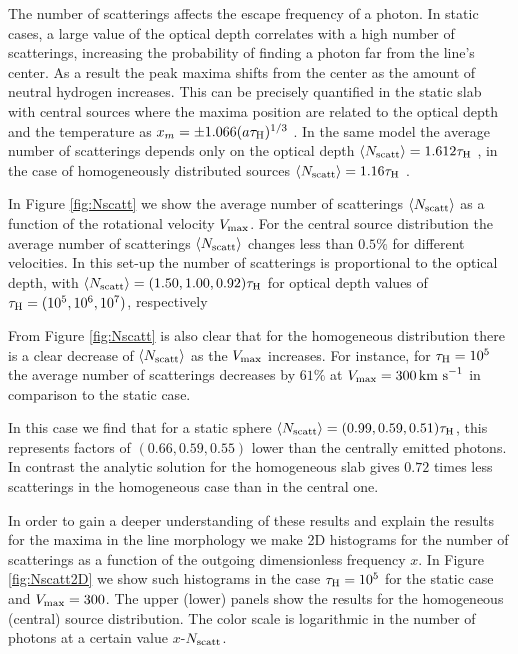 \documentclass{emulateapj}
\newcommand{\ly}{{\ifmmode{{\rm Ly}\alpha~}\else{Ly$\alpha$~}\fi}}
\newcommand{\kms}{{\ifmmode{{\mathrm{\,km\ s}^{-1}}}\else{\,km~s$^{-1}$}\fi}}
\begin{document}
The number of scatterings affects the escape frequency of a \ly photon.
In static cases, a large value of the optical depth correlates with a
high number of scatterings, increasing the probability of finding a
\ly photon far from the line's center. As a result the peak maxima
shifts from the center as the amount of neutral hydrogen
increases. This can be precisely quantified in the static slab
with central sources where the maxima position are related to
the optical depth and the temperature as $x_{m}=\pm 1.066(a\tau_{\rm
  H})^{1/3}$ \citep{Harrington73}. In the same model the average
number of scatterings depends only on the optical depth $\langle
N_{\rm  scatt}\rangle=1.612\tau_{\rm   H}$
\citep{Adams72,Harrington73}, in the case of homogeneously distributed
sources $\langle N_{\rm   scatt}\rangle=1.16\tau_{\rm   H}$
\citep{Harrington73}.   



In Figure \ref{fig:Nscatt} we show the average number of scatterings
$\langle N_{\rm scatt}\rangle$ as a function of the rotational velocity
$V_{\rm max}$. For the central source distribution the average number of
scatterings $\langle N_{\rm   scatt}\rangle$ changes less than $0.5\%$
for different velocities. In this set-up the number of scatterings is
proportional to the optical depth, with $\langle N_{\rm
  scatt}\rangle= (1.50, 1.00, 0.92)\tau_{\rm   H}$ for optical depth
values of $\tau_{\rm H} = (10^{5}, 10^{6}, 10^{7})$, respectively


From Figure \ref{fig:Nscatt} is also clear that for the homogeneous
distribution there is a clear decrease of $\langle N_{\rm
  scatt}\rangle$ as the $V_{\rm max}$ increases. For instance, for
$\tau_{\rm H}=10^5$ the average number of scatterings decreases by
$61\%$ at $V_{\rm max}=300\kms$ in comparison to the static case.  

In this case we find that for a static sphere $\langle N_{\rm
  scatt}\rangle= (0.99, 0.59, 0.51)\tau_{\rm   H}$, this
represents factors of $(0.66, 0.59, 0.55)$ lower than the centrally
emitted photons. In contrast the analytic solution for the homogeneous
slab gives $0.72$ times less scatterings in the homogeneous case than
in the central one. 

In order to gain a deeper understanding of these results and explain
the results for the maxima in the line morphology we make 2D
histograms for the number of scatterings as a function of the outgoing
dimensionless frequency $x$. In Figure \ref{fig:Nscatt2D} we show
such histograms in the case $\tau_{\rm H}=10^5$ for the
static case and $V_{\rm max}=300$\kms. The upper (lower) panels show the
results for the homogeneous (central) source distribution. The color
scale is logarithmic in the number of photons at a certain value
$x$-$N_{\rm scatt}$. 
\end{document}
